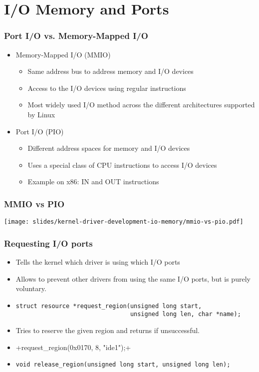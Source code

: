 \section{I/O Memory and Ports}

\begin{frame}
  \frametitle{Port I/O vs. Memory-Mapped I/O}
  \begin{itemize}
  \item Memory-Mapped I/O (MMIO)
    \begin{itemize}
    \item Same address bus to address memory and I/O devices
    \item Access to the I/O devices using regular instructions
    \item Most widely used I/O method across the different
      architectures supported by Linux
    \end{itemize}
  \item Port I/O (PIO)
    \begin{itemize}
    \item Different address spaces for memory and I/O devices
    \item Uses a special class of CPU instructions to access I/O
      devices
    \item Example on x86: IN and OUT instructions
    \end{itemize}
  \end{itemize}
\end{frame}

\begin{frame}
  \frametitle{MMIO vs PIO}
  \begin{center}
    \texttt{[image: slides/kernel-driver-development-io-memory/mmio-vs-pio.pdf]}
  \end{center}
\end{frame}

\begin{frame}[fragile]
  \frametitle{Requesting I/O ports}
  \begin{itemize}
  \item Tells the kernel which driver is using which I/O ports
  \item Allows to prevent other drivers from using the same I/O ports,
    but is purely voluntary.
  \item
\begin{verbatim}
struct resource *request_region(unsigned long start,
                                unsigned long len, char *name);
\end{verbatim}
  \item Tries to reserve the given region and returns  if unsuccessful.
  \item {}+request_region(0x0170, 8, "ide1");+
  \item
\begin{verbatim}
void release_region(unsigned long start, unsigned long len);
\end{verbatim}
\end{itemize}
\end{frame}

